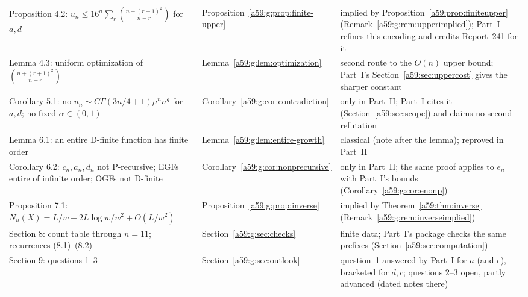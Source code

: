 \documentclass[11pt,letterpaper]{article}
\theoremstyle{remark}\newtheorem{remark}[theorem]{Remark}
\theoremstyle{remark}\newtheorem{wremark}{Remark}\renewcommand{\thewremark}{W\arabic{wremark}}
\theoremstyle{plain}\newtheorem{wcorollary}[wremark]{Corollary}
\begin{document}
\begin{small}
\begin{longtable}{@{}>{\raggedright\arraybackslash}p{}>{\raggedright\arraybackslash}p{}>{\raggedright\arraybackslash}p{}@{}}
Proposition 4.2: $u_n\le16^n\sum_r\binom{n+(r+1)^2}{n-r}$ for $a,d$ & Proposition~\ref{a59:g:prop:finite-upper} & implied by Proposition~\ref{a59:prop:finiteupper} (Remark~\ref{a59:g:rem:upperimplied}); Part~I refines this encoding and credits Report~241 for it\\
Lemma 4.3: uniform optimization of $\binom{n+(r+1)^2}{n-r}$ & Lemma~\ref{a59:g:lem:optimization} & second route to the $O(n)$ upper bound; Part~I's Section~\ref{a59:sec:uppercost} gives the sharper constant\\
Corollary 5.1: no $u_n\sim C\Gamma(3n/4+1)\mu^nn^g$ for $a,d$; no fixed $\alpha\in(0,1)$ & Corollary~\ref{a59:g:cor:contradiction} & only in Part~II; Part~I cites it (Section~\ref{a59:sec:scope}) and claims no second refutation\\
Lemma 6.1: an entire D-finite function has finite order & Lemma~\ref{a59:g:lem:entire-growth} & classical (note after the lemma); reproved in Part~II\\
Corollary 6.2: $c_n,a_n,d_n$ not P-recursive; EGFs entire of infinite order; OGFs not D-finite & Corollary~\ref{a59:g:cor:nonprecursive} & only in Part~II; the same proof applies to $e_n$ with Part~I's bounds (Corollary~\ref{a59:g:cor:enonp})\\
Proposition 7.1: $N_u(X)=L/w+2L\log w/w^2+O(L/w^2)$ & Proposition~\ref{a59:g:prop:inverse} & implied by Theorem~\ref{a59:thm:inverse} (Remark~\ref{a59:g:rem:inverseimplied})\\
Section 8: count table through $n=11$; recurrences (8.1)--(8.2) & Section~\ref{a59:g:sec:checks} & finite data; Part~I's package checks the same prefixes (Section~\ref{a59:sec:computation})\\
Section 9: questions 1--3 & Section~\ref{a59:g:sec:outlook} & question~1 answered by Part~I for $a$ (and $e$), bracketed for $d,c$; questions 2--3 open, partly advanced (dated notes there)\\
\bottomrule
\end{longtable}
\end{small}
\end{document}
